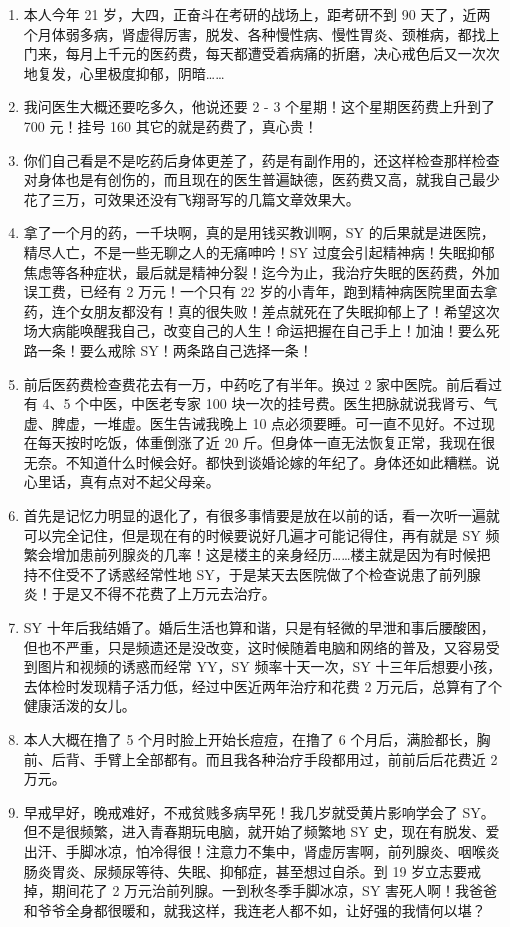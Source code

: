 \documentclass[fontset=founder]{ctexart}
\begin{document}
\begin{enumerate}
    \item 本人今年 21 岁，大四，正奋斗在考研的战场上，距考研不到 90 天了，近两个月体弱多病，肾虚得厉害，脱发、各种慢性病、慢性胃炎、颈椎病，都找上门来，每月上千元的医药费，每天都遭受着病痛的折磨，决心戒色后又一次次地复发，心里极度抑郁，阴暗……
    \item 我问医生大概还要吃多久，他说还要 2 - 3 个星期！这个星期医药费上升到了 700 元！挂号 160 其它的就是药费了，真心贵！
    \item 你们自己看是不是吃药后身体更差了，药是有副作用的，还这样检查那样检查对身体也是有创伤的，而且现在的医生普遍缺德，医药费又高，就我自己最少花了三万，可效果还没有飞翔哥写的几篇文章效果大。
    \item 拿了一个月的药，一千块啊，真的是用钱买教训啊，SY 的后果就是进医院，精尽人亡，不是一些无聊之人的无痛呻吟！SY 过度会引起精神病！失眠抑郁焦虑等各种症状，最后就是精神分裂！迄今为止，我治疗失眠的医药费，外加误工费，已经有 2 万元！一个只有 22 岁的小青年，跑到精神病医院里面去拿药，连个女朋友都没有！真的很失败！差点就死在了失眠抑郁上了！希望这次场大病能唤醒我自己，改变自己的人生！命运把握在自己手上！加油！要么死路一条！要么戒除 SY！两条路自己选择一条！
    \item 前后医药费检查费花去有一万，中药吃了有半年。换过 2 家中医院。前后看过有 4、5 个中医，中医老专家 100 块一次的挂号费。医生把脉就说我肾亏、气虚、脾虚，一堆虚。医生告诫我晚上 10 点必须要睡。可一直不见好。不过现在每天按时吃饭，体重倒涨了近 20 斤。但身体一直无法恢复正常，我现在很无奈。不知道什么时候会好。都快到谈婚论嫁的年纪了。身体还如此糟糕。说心里话，真有点对不起父母亲。
    \item 首先是记忆力明显的退化了，有很多事情要是放在以前的话，看一次听一遍就可以完全记住，但是现在有的时候要说好几遍才可能记得住，再有就是 SY 频繁会增加患前列腺炎的几率！这是楼主的亲身经历……楼主就是因为有时候把持不住受不了诱惑经常性地 SY，于是某天去医院做了个检查说患了前列腺炎！于是又不得不花费了上万元去治疗。
    \item SY 十年后我结婚了。婚后生活也算和谐，只是有轻微的早泄和事后腰酸困，但也不严重，只是频遗还是没改变，这时候随着电脑和网络的普及，又容易受到图片和视频的诱惑而经常 YY，SY 频率十天一次，SY 十三年后想要小孩，去体检时发现精子活力低，经过中医近两年治疗和花费 2 万元后，总算有了个健康活泼的女儿。
    \item 本人大概在撸了 5 个月时脸上开始长痘痘，在撸了 6 个月后，满脸都长，胸前、后背、手臂上全部都有。而且我各种治疗手段都用过，前前后后花费近 2 万元。
    \item 早戒早好，晚戒难好，不戒贫贱多病早死！我几岁就受黄片影响学会了 SY。但不是很频繁，进入青春期玩电脑，就开始了频繁地 SY 史，现在有脱发、爱出汗、手脚冰凉，怕冷得很！注意力不集中，肾虚厉害啊，前列腺炎、咽喉炎肠炎胃炎、尿频尿等待、失眠、抑郁症，甚至想过自杀。到 19 岁立志要戒掉，期间花了 2 万元治前列腺。一到秋冬季手脚冰凉，SY 害死人啊！我爸爸和爷爷全身都很暖和，就我这样，我连老人都不如，让好强的我情何以堪？

\end{enumerate}
\end{document}
